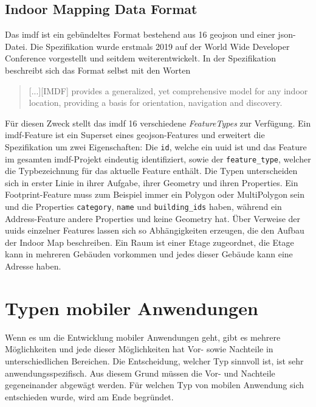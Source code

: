 \subsection{Indoor Mapping Data Format}
Das \ac{imdf} ist ein gebündeltes Format bestehend aus 16 \ac{geojson} und einer \ac{json}-Datei. Die Spezifikation wurde erstmals 2019 auf der World Wide Developer Conference vorgestellt \parencite{GOD2019} und seitdem weiterentwickelt. In der Spezifikation beschreibt sich das Format selbst mit den Worten \blockquote{[...][IMDF] provides a generalized, yet comprehensive model for any indoor location, providing a basis for orientation, navigation and discovery.} \parencite{HOA2019}\pbreak%
%
Für diesen Zweck stellt das \ac{imdf} 16 verschiedene \textit{FeatureTypes} zur Verfügung. Ein \ac{imdf}-Feature ist ein Superset eines \ac{geojson}-Features und erweitert die Spezifikation um zwei Eigenschaften: Die \texttt{id}, welche ein \ac{uuid} ist und das Feature im gesamten \ac{imdf}-Projekt eindeutig identifiziert, sowie der \texttt{feature\_type}, welcher die Typbezeichnung für das aktuelle Feature enthält.
Die Typen unterscheiden sich in erster Linie in ihrer Aufgabe, ihrer Geometry und ihren Properties. Ein Footprint-Feature muss zum Beispiel immer ein Polygon oder MultiPolygon sein und die Properties \texttt{category}, \texttt{name} und \texttt{building\_ids} haben, während ein Address-Feature andere Properties und keine Geometry hat.\pbreak%
%
Über Verweise der \ac{uuid}s einzelner Features lassen sich so Abhängigkeiten erzeugen, die den Aufbau der Indoor Map beschreiben. Ein Raum ist einer Etage zugeordnet, die Etage kann in mehreren Gebäuden vorkommen und jedes dieser Gebäude kann eine Adresse haben.

\section{Typen mobiler Anwendungen}
Wenn es um die Entwicklung mobiler Anwendungen geht, gibt es mehrere Möglichkeiten und jede dieser Möglichkeiten hat Vor- sowie Nachteile in unterschiedlichen Bereichen.
Die Entscheidung, welcher Typ sinnvoll ist, ist sehr anwendungsspezifisch.
Aus diesem Grund müssen die Vor- und Nachteile gegeneinander abgewägt werden.
Für welchen Typ von mobilen Anwendung sich entschieden wurde, wird am Ende begründet.

